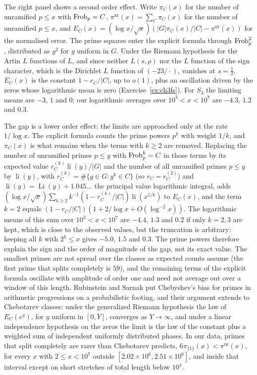 The right panel shows a second order effect. Write $\pi_C(x)$ for the number of unramified $p\le x$ with $\operatorname{Frob}_p=C$, $\pi^{\mathrm{ur}}(x)=\sum_C\pi_C(x)$ for the number of unramified $p\le x$, and $E_C(x)=(\log x/\sqrt x)(|G|\pi_C(x)/|C|-\pi^{\mathrm{ur}}(x))$ for the normalised error. The prime squares enter the explicit formula through $\operatorname{Frob}_p^2$, distributed as $g^2$ for $g$ uniform in $G$. Under the Riemann hypothesis for the Artin $L$ functions of $L$, and since neither $L(s,\rho)$ nor the $L$ function of the sign character, which is the Dirichlet $L$ function of $(-23/\cdot)$, vanishes at $s=\frac12$, $E_C(x)$ is the constant $1-r_C/|C|$, up to $o(1)$, plus an oscillation driven by the zeros whose logarithmic mean is zero (Exercise~\ref{ex:ch3fs}). For $S_3$ the limiting means are $-3$, $1$ and $0$; our logarithmic averages over $10^3<x<10^7$ are $-4.3$, $1.2$ and $0.3$.

The gap is a lower order effect: the limits are approached only at the rate $1/\log x$. The explicit formula counts the prime powers $p^k$ with weight $1/k$, and $\pi_C(x)$ is what remains when the terms with $k\ge2$ are removed. Replacing the number of unramified primes $p\le y$ with $\operatorname{Frob}_p^k=C$ in those terms by its expected value $r_C^{(k)}\operatorname{li}(y)/|G|$ and the number of all unramified primes $p\le y$ by $\operatorname{li}(y)$, with $r_C^{(k)}=\#\{g\in G:g^k\in C\}$ (so $r_C=r_C^{(2)}$) and $\operatorname{li}(y)=\operatorname{Li}(y)+1.045\ldots$ the principal value logarithmic integral, adds $(\log x/\sqrt x)\sum_{k\ge2}k^{-1}(1-r_C^{(k)}/|C|)\operatorname{li}(x^{1/k})$ to $E_C(x)$, and the term $k=2$ equals $(1-r_C/|C|)(1+2/\log x+O(\log^{-2}x))$. The logarithmic means of this sum over $10^3<x<10^7$ are $-4.4$, $1.3$ and $0.2$ if only $k=2,3$ are kept, which is close to the observed values, but the truncation is arbitrary: keeping all $k$ with $2^k\le x$ gives $-5.0$, $1.5$ and $0.3$. The prime powers therefore explain the sign and the order of magnitude of the gap, not its exact value. The smallest primes are not spread over the classes as expected counts assume (the first prime that splits completely is $59$), and the remaining terms of the explicit formula oscillate with amplitude of order one and need not average out over a window of this length. Rubinstein and Sarnak \cite{rubinsteinsarnak1994} put Chebyshev's bias for primes in arithmetic progressions on a probabilistic footing, and their argument extends to Chebotarev classes: under the generalized Riemann hypothesis the law of $E_C(e^y)$, for $y$ uniform in $[0,Y]$, converges as $Y\to\infty$, and under a linear independence hypothesis on the zeros the limit is the law of the constant plus a weighted sum of independent uniformly distributed phases. In our data, primes that split completely are rarer than Chebotarev predicts, $6\pi_{\{1\}}(x)<\pi^{\mathrm{ur}}(x)$, for every $x$ with $2\le x<10^7$ outside $[2.02\times10^6,2.51\times10^6]$, and inside that interval except on short stretches of total length below $10^4$.

